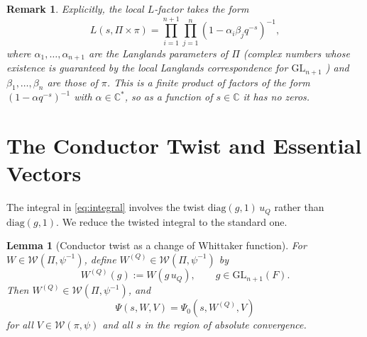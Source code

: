 \documentclass[12pt]{article}
\newtheorem{lemma}[theorem]{Lemma}
\newtheorem{remark}[theorem]{Remark}
\begin{document}
\begin{remark}\label{rem:Lform}
Explicitly, the local $L$-factor takes the form
\begin{equation}\label{eq:Lform}
  L(s,\Pi\times\pi) = \prod_{i=1}^{n+1}\prod_{j=1}^{n} (1 - \alpha_i \beta_j q^{-s})^{-1},
\end{equation}
where $\alpha_1,\ldots,\alpha_{n+1}$ are the Langlands parameters of $\Pi$
(complex numbers whose existence is guaranteed by the local Langlands
correspondence for $\mathrm{GL}_{n+1}$ \cite{HT01,Hen00}) and
$\beta_1,\ldots,\beta_n$ are those of $\pi$.  This is a finite product of
factors of the form $(1 - \alpha q^{-s})^{-1}$ with $\alpha \in \mathbb{C}^*$,
so as a function of $s \in \mathbb{C}$ it has no zeros.
\end{remark}

\section{The Conductor Twist and Essential Vectors}

The integral in \eqref{eq:integral} involves the twist $\mathrm{diag}(g,1)\,u_Q$
rather than $\mathrm{diag}(g,1)$.  We reduce the twisted integral to the
standard one.

\begin{lemma}[Conductor twist as a change of Whittaker function]%
\label{lem:twist}
For $W \in \mathcal{W}(\Pi,\psi^{-1})$, define $W^{(Q)} \in \mathcal{W}(\Pi,\psi^{-1})$ by
\begin{equation}\label{eq:WQ}
  W^{(Q)}(g) := W(g\,u_Q), \qquad g \in \mathrm{GL}_{n+1}(F).
\end{equation}
Then $W^{(Q)} \in \mathcal{W}(\Pi,\psi^{-1})$, and
\begin{equation}\label{eq:twist-reduction}
  \Psi(s,W,V) = \Psi_0(s, W^{(Q)}, V)
\end{equation}
for all $V \in \mathcal{W}(\pi,\psi)$ and all $s$ in the region of absolute
convergence.
\end{lemma}
\end{document}
